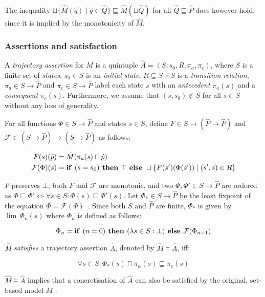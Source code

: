 \noindent The inequality $\sqcup \{ \hat M(\hat q) \mid \hat q \in \hat Q \} \sqsubseteq \hat M(\sqcup \hat Q)$ for all $\hat Q \sqsubseteq \hat P$ does however hold, since it is implied by the monotonicity of $\hat M$.

\subsubsection{Assertions and satisfaction}

A \textit{trajectory assertion} for $\hat M$ is a quintuple $\hat A = (S,s_{0},R,\pi_{a},\pi_{c})$, where $S$ is a finite set of \textit{states}, $s_{0} \in S$ is an \textit{initial state}, $R \subseteq S \times S$ is a \textit{transition relation}, $\pi_{a} \in S \rightarrow \hat P$ and $\pi_{c} \in S \rightarrow \hat P$ label each state $s$ with an \textit{antecedent} $\pi_{a}(s)$ and a \textit{consequent} $\pi_{c}(s)$. Furthermore, we assume that $(s,s_{0}) \notin S$ for all $s \in S$ without any loss of generality.

For all functions $\Phi \in S \rightarrow \hat P$ and states $s \in S$, define $F \in S \rightarrow (\hat P \rightarrow \hat P)$ and $\mathcal{F} \in (S \rightarrow \hat P) \rightarrow (S \rightarrow \hat P)$ as follows:

\begin{align}
F(s)(\hat p) &= \hat M(\pi_{a}(s) \sqcap \hat p) \\
\mathcal{F}(\Phi)(s) &= \textrm{\textbf{if }} (s = s_{0}) \textrm{\textbf{ then }} \top \textrm{\textbf{ else }} \sqcup \{ F(s')(\Phi(s')) \mid (s',s) \in R \}
\end{align}

\noindent $F$ preserves $\bot$, both $F$ and $\mathcal{F}$ are monotonic, and two $\Phi, \Phi' \in S \rightarrow \hat P$ are ordered as $\Phi \sqsubseteq \Phi' \iff \forall s \in S : \Phi(s) \sqsubseteq \Phi'(s)$. Let $\Phi_{*} \in S \rightarrow \hat P$ be the least fixpoint of the equation $\Phi = \mathcal{F}(\Phi)$~\cite{davey2002}. Since both $S$ and $\hat P$ are finite, $\Phi_{*}$ is given by $\lim \, \Phi_{n}(s)$ where $\Phi_{n}$ is defined as follows:

\begin{equation}
\Phi_{n} = \textrm{\textbf{if }} (n = 0) \textrm{\textbf{ then }} (\lambda s \in S : \bot) \textrm{\textbf{ else }} \mathcal{F}(\Phi_{n-1})
\end{equation}

$\hat M$ \textit{satisfies} a trajectory assertion $\hat A$, denoted by $\hat M \models \hat A$, iff:

\begin{equation}
\forall s \in S : \Phi_{*}(s) \sqcap \pi_{\alpha}(s) \sqsubseteq \pi_{c}(s)
\end{equation}

\noindent $\hat M \models \hat A$ implies that a concretisation of $\hat A$ can also be satisfied by the original, set-based model $M$ \cite{chou1999}.
